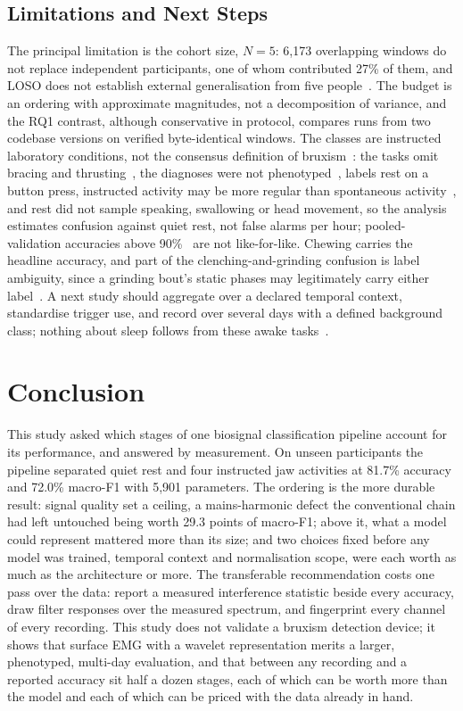 \documentclass[journal]{IEEEtran}
\begin{document}
\subsection{Limitations and Next Steps}

The principal limitation is the cohort size, $N=5$: 6,173 overlapping windows do not replace independent participants, one of whom contributed 27\% of them, and LOSO does not establish external generalisation from five people~\cite{varoquaux2018cross}. The budget is an ordering with approximate magnitudes, not a decomposition of variance, and the RQ1 contrast, although conservative in protocol, compares runs from two codebase versions on verified byte-identical windows. The classes are instructed laboratory conditions, not the consensus definition of bruxism~\cite{lobbezoo2018international}: the tasks omit bracing and thrusting~\cite{verhoeff2025definitions}, the diagnoses were not phenotyped~\cite{manfredini2024standardised}, labels rest on a button press, instructed activity may be more regular than spontaneous activity~\cite{farella2008masticatory}, and rest did not sample speaking, swallowing or head movement, so the analysis estimates confusion against quiet rest, not false alarms per hour; pooled-validation accuracies above 90\%~\cite{sonmezocak2021detection} are not like-for-like. Chewing carries the headline accuracy, and part of the clenching-and-grinding confusion is label ambiguity, since a grinding bout's static phases may legitimately carry either label~\cite{lan2022comparative}. A next study should aggregate over a declared temporal context, standardise trigger use, and record over several days with a defined background class; nothing about sleep follows from these awake tasks~\cite{lavigne1996sleep,casett2017validity}.

\section{Conclusion}

This study asked which stages of one biosignal classification pipeline account for its performance, and answered by measurement. On unseen participants the pipeline separated quiet rest and four instructed jaw activities at 81.7\% accuracy and 72.0\% macro-F1 with 5,901 parameters. The ordering is the more durable result: signal quality set a ceiling, a mains-harmonic defect the conventional chain had left untouched being worth 29.3 points of macro-F1; above it, what a model could represent mattered more than its size; and two choices fixed before any model was trained, temporal context and normalisation scope, were each worth as much as the architecture or more. The transferable recommendation costs one pass over the data: report a measured interference statistic beside every accuracy, draw filter responses over the measured spectrum, and fingerprint every channel of every recording. This study does not validate a bruxism detection device; it shows that surface EMG with a wavelet representation merits a larger, phenotyped, multi-day evaluation, and that between any recording and a reported accuracy sit half a dozen stages, each of which can be worth more than the model and each of which can be priced with the data already in hand.
\end{document}
